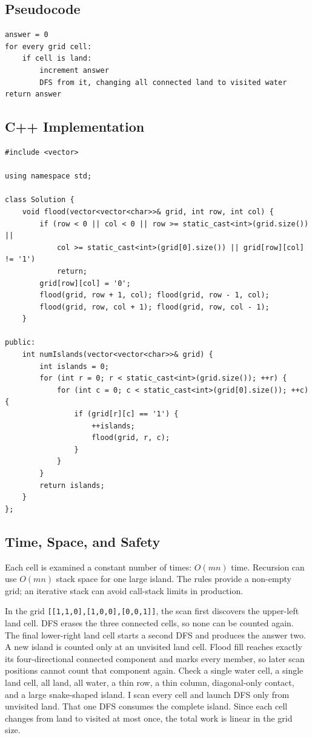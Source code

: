 \subsection{Pseudocode}
\begin{lstlisting}[style=pseudocode]
answer = 0
for every grid cell:
    if cell is land:
        increment answer
        DFS from it, changing all connected land to visited water
return answer
\end{lstlisting}

\subsection{C++ Implementation}
\begin{lstlisting}[style=compactcode,caption={Complete C++ solution: Number of Islands}]
#include <vector>

using namespace std;

class Solution {
    void flood(vector<vector<char>>& grid, int row, int col) {
        if (row < 0 || col < 0 || row >= static_cast<int>(grid.size()) ||
            col >= static_cast<int>(grid[0].size()) || grid[row][col] != '1')
            return;
        grid[row][col] = '0';
        flood(grid, row + 1, col); flood(grid, row - 1, col);
        flood(grid, row, col + 1); flood(grid, row, col - 1);
    }

public:
    int numIslands(vector<vector<char>>& grid) {
        int islands = 0;
        for (int r = 0; r < static_cast<int>(grid.size()); ++r) {
            for (int c = 0; c < static_cast<int>(grid[0].size()); ++c) {
                if (grid[r][c] == '1') {
                    ++islands;
                    flood(grid, r, c);
                }
            }
        }
        return islands;
    }
};
\end{lstlisting}

\subsection{Time, Space, and Safety}
Each cell is examined a constant number of times: \(O(mn)\) time. Recursion
can use \(O(mn)\) stack space for one large island. The rules provide a
non-empty grid; an iterative stack can avoid call-stack limits in production.

\lessonexpansion
  {In the grid \texttt{[[1,1,0],[1,0,0],[0,0,1]]}, the scan first discovers
   the upper-left land cell. DFS erases the three connected cells, so none can
   be counted again. The final lower-right land cell starts a second DFS and
   produces the answer two.}
  {A new island is counted only at an unvisited land cell. Flood fill reaches
   exactly its four-directional connected component and marks every member,
   so later scan positions cannot count that component again.}
  {Check a single water cell, a single land cell, all land, all water, a thin
   row, a thin column, diagonal-only contact, and a large snake-shaped island.}
  {I scan every cell and launch DFS only from unvisited land. That one DFS
   consumes the complete island. Since each cell changes from land to visited
   at most once, the total work is linear in the grid size.}

